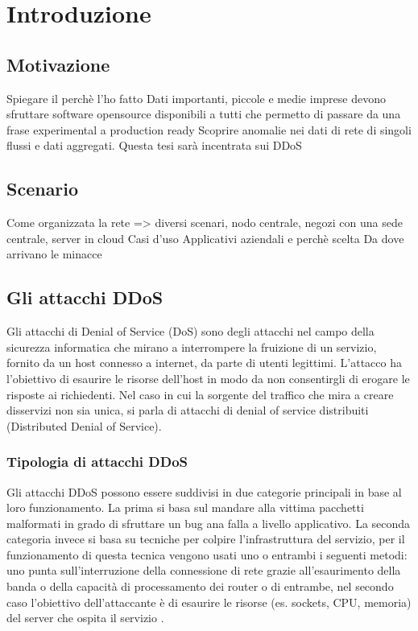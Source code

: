 \chapter{Introduzione}


\section{Motivazione}
Spiegare il perchè l'ho fatto
Dati importanti, piccole e medie imprese devono sfruttare software opensource disponibili a tutti che permetto di passare da una frase experimental a production ready
Scoprire anomalie nei dati di rete di singoli flussi e dati aggregati.
Questa tesi sarà incentrata sui DDoS

\section{Scenario}
Come organizzata la rete => diversi scenari, nodo centrale, negozi con una sede centrale, server in cloud
Casi d'uso
Applicativi aziendali e perchè scelta
Da dove arrivano le minacce


\section{Gli attacchi DDoS}

Gli attacchi di Denial of Service (DoS) sono degli attacchi nel campo della sicurezza informatica che mirano a interrompere la fruizione di un servizio, fornito da un host connesso a internet, da parte di utenti legittimi. L'attacco ha l'obiettivo di esaurire le risorse dell'host in modo da non consentirgli di erogare le risposte ai richiedenti.
Nel caso in cui la sorgente del traffico che mira a creare disservizi non sia unica, si parla di attacchi di denial of service distribuiti (Distributed Denial of Service).

\subsection{Tipologia di attacchi DDoS}
    
Gli attacchi DDoS possono essere suddivisi in due categorie principali in base al loro funzionamento. La prima si basa sul mandare alla vittima pacchetti malformati in grado di sfruttare un bug ana falla a livello applicativo. La seconda categoria invece si basa su tecniche per colpire l'infrastruttura del servizio, per il funzionamento di questa tecnica vengono usati uno o entrambi i seguenti metodi: uno punta sull'interruzione della connessione di rete grazie all'esaurimento della banda o della capacità di processamento dei router o di entrambe, nel secondo caso l'obiettivo dell'attaccante è di esaurire le risorse (es. sockets, CPU, memoria) del server che ospita il servizio \cite{ddos_survey_1}.

